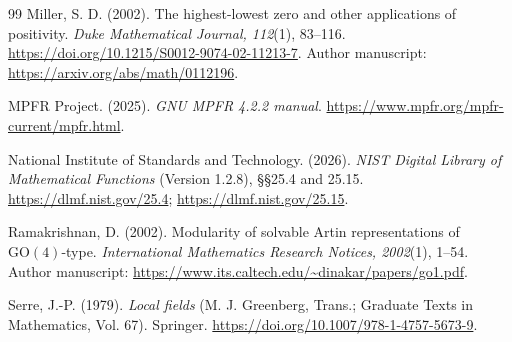 \documentclass[11pt]{article}
\theoremstyle{definition}
\theoremstyle{remark}
\numberwithin{equation}{section}
\begin{document}
\begin{thebibliography}{99}
Miller, S. D. (2002). The highest-lowest zero and other applications of positivity.
\emph{Duke Mathematical Journal, 112}(1), 83--116.
\url{https://doi.org/10.1215/S0012-9074-02-11213-7}.
Author manuscript: \url{https://arxiv.org/abs/math/0112196}.

MPFR Project. (2025). \emph{GNU MPFR 4.2.2 manual}.
\url{https://www.mpfr.org/mpfr-current/mpfr.html}.

National Institute of Standards and Technology. (2026).
\emph{NIST Digital Library of Mathematical Functions} (Version 1.2.8), \S\S25.4 and 25.15.
\url{https://dlmf.nist.gov/25.4}; \url{https://dlmf.nist.gov/25.15}.

Ramakrishnan, D. (2002). Modularity of solvable Artin representations of $\mathrm{GO}(4)$-type.
\emph{International Mathematics Research Notices, 2002}(1), 1--54.
Author manuscript: \url{https://www.its.caltech.edu/~dinakar/papers/go1.pdf}.

Serre, J.-P. (1979). \emph{Local fields} (M. J. Greenberg, Trans.; Graduate Texts in Mathematics, Vol. 67).
Springer. \url{https://doi.org/10.1007/978-1-4757-5673-9}.

\end{thebibliography}
\end{document}
